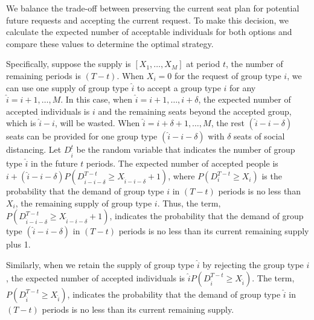 We balance the trade-off between preserving the current seat plan for potential future requests and accepting the current request. To make this decision, we calculate the expected number of acceptable individuals for both options and compare these values to determine the optimal strategy.


Specifically, suppose the supply is $[X_1, \ldots, X_M]$ at period $t$, the number of remaining periods is $(T-t)$. When $X_{i} = 0$ for the request of group type $i$, we can use one supply of group type $\hat{i}$ to accept a group type ${i}$ for any $\hat{i}={i}+1, \ldots, M$. In this case, when $\hat{i} = {i}+1, \ldots, i+\delta$, the expected number of accepted individuals is ${i}$ and the remaining seats beyond the accepted group, which is $\hat{i}-{i}$, will be wasted. When $\hat{i} = {i}+\delta+1, \ldots, M$, the rest $(\hat{i}-{i}-\delta)$ seats can be provided for one group type $(\hat{i}-{i}-\delta)$ with $\delta$ seats of social distancing. Let $D_{\hat{i}}^{t}$ be the random variable that indicates the number of group type $\hat{i}$ in the future $t$ periods. The expected number of accepted people is ${i} + (\hat{i}-{i}-\delta)P(D_{\hat{i}-{i}-\delta}^{T-t} \geq X_{\hat{i}-{i}-\delta}+1)$, where $P(D_{i}^{T-t} \geq X_{i})$ is the probability that the demand of group type ${i}$ in $(T-t)$ periods is no less than $X_{i}$, the remaining supply of group type ${i}$. Thus, the term, $P(D_{\hat{i}-{i}-\delta}^{T-t} \geq X_{\hat{i}-{i}-\delta}+1)$, indicates the probability that the demand of group type $(\hat{i}-{i}-\delta)$ in $(T-t)$ periods is no less than its current remaining supply plus 1.

Similarly, when we retain the supply of group type $\hat{i}$ by rejecting the group type ${i}$, the expected number of accepted individuals is $\hat{i} P(D_{\hat{i}}^{T-t} \geq X_{\hat{i}})$. The term, $P(D_{\hat{i}}^{T-t} \geq X_{\hat{i}})$, indicates the probability that the demand of group type $\hat{i}$ in $(T-t)$ periods is no less than its current remaining supply.


